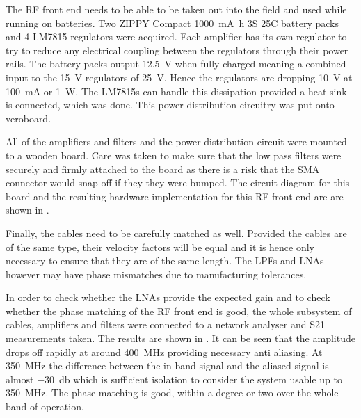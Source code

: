 The RF front end needs to be able to be taken out into the field and used while running on batteries.
Two ZIPPY Compact \SI{1000}{\milli\ampere\hour} 3S 25C battery packs and 4 LM7815 regulators were acquired. 
Each amplifier has its own regulator to try to reduce any electrical coupling between the regulators through their power rails.
The battery packs output \SI{12.5}{\volt} when fully charged meaning a combined input to the \SI{15}{\volt} regulators of \SI{25}{\volt}. Hence the regulators are dropping \SI{10}{\volt} at \SI{100}{\milli\ampere} or \SI{1}{\watt}.
The LM7815s can handle this dissipation provided a heat sink is connected, which was done.
This power distribution circuitry was put onto veroboard.

All of the amplifiers and filters and the power distribution circuit were mounted to a wooden board.
Care was taken to make sure that the low pass filters were securely and firmly attached to the board as there is a risk that the SMA connector would snap off if they they were bumped. 
The circuit diagram for this board and the resulting hardware implementation for this RF front end are are shown in .

Finally, the cables need to be carefully matched as well. Provided the cables are of the same type, their velocity factors will be equal and it is hence only necessary to ensure that they are of the same length. The LPFs and LNAs however may have phase mismatches due to manufacturing tolerances. 

In order to check whether the LNAs provide the expected gain and to check whether the phase matching of the RF front end is good, the whole subsystem of cables, amplifiers and filters were connected to a network analyser and S21 measurements taken. The results are shown in . It can be seen that the amplitude drops off rapidly at around \SI{400}{\mega\hertz} providing necessary anti aliasing. At \SI{350}{\mega\hertz} the difference between the in band signal and the aliased signal is almost \SI{-30}{\decibel} which is sufficient isolation to consider the system usable up to \SI{350}{\mega\hertz}. The phase matching is good, within a degree or two over the whole band of operation.

